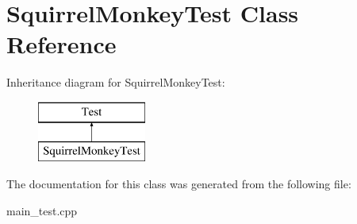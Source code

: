 \hypertarget{class_squirrel_monkey_test}{}\section{Squirrel\+Monkey\+Test Class Reference}
\label{class_squirrel_monkey_test}
Inheritance diagram for Squirrel\+Monkey\+Test\+:\begin{figure}[H]
\begin{center}
\leavevmode
\includegraphics[height=2.000000cm]{class_squirrel_monkey_test}
\end{center}
\end{figure}


The documentation for this class was generated from the following file\+:\begin{DoxyCompactItemize}
\item 
main\+\_\+test.\+cpp\end{DoxyCompactItemize}

